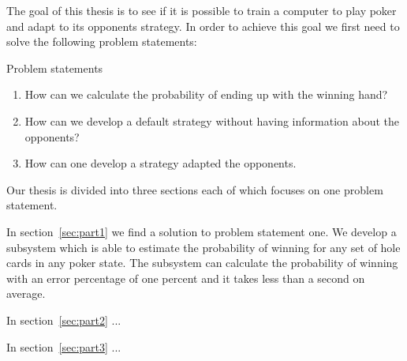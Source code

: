The goal of this thesis is to see if it is possible to train a computer to play poker and adapt to its opponents strategy. In order to achieve this goal we first need to solve the following problem statements:


\vspace{4mm}
\begin{statementBox2}{Problem statements}
\begin{enumerate}
    \item \label{itm:q1} How can we calculate the probability of ending up with the winning hand? 
    \item \label{itm:q2} How can we develop a default strategy without having information about the opponents? 
    \item \label{itm:q3} How can one develop a strategy adapted the opponents.
  \end{enumerate}
\end{statementBox2}
\vspace{4mm}

Our thesis is divided into three sections each of which focuses on one problem statement.

In section~\ref{sec:part1} we find a solution to problem statement one. We develop a subsystem which is able to estimate the probability of winning for any set of hole cards in any poker state. The subsystem can calculate the probability of winning with an error percentage of one percent and it takes less than a second on average.

In section~\ref{sec:part2} ...

In section~\ref{sec:part3} ...
